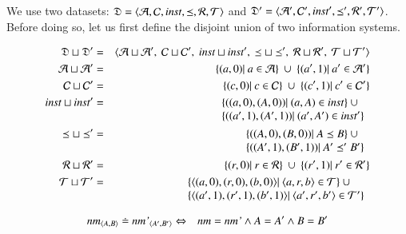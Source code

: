 \documentclass{elsarticle}
\begin{document}
	We use two datasets: $\mathfrak{D}=\langle\mathcal{A},\mathcal{C},\text{\it inst\/},\preceq,\mathcal{R},\mathcal{T}\rangle$ and $\mathfrak{D}'=\langle\mathcal{A}',\mathcal{C}',\text{\it inst\/}',\preceq',\mathcal{R}',\mathcal{T}'\rangle$.
	Before doing so, let us first define the disjoint union of two information systems.
\begin{definition}
	\begin{eqnarray}
		\dataset\sqcup\dataset'&=&\la\atoms\sqcup\atoms',\ \concepts\sqcup\concepts',\ \inst\sqcup\inst',\ \isa\sqcup\isa',\ \rels\sqcup\rels',\ \triples\sqcup\triples'\ra\\
		\atoms\sqcup\atoms'&=&\{(a,0)|\ a\in\atoms\}\ \cup\ \{(a',1)|\ a'\in\atoms'\}\\
		\concepts\sqcup\concepts'&=&\{(c,0)|\ c\in\concepts\}\ \cup\ \{(c',1)|\ c'\in\concepts'\}\\
		\inst\sqcup\inst'&=&\begin{array}[t]{@{}l}
							  \{((a,0),(A,0))|\ (a,A)\in\inst\}\ \cup\\
			                  \{((a',1),(A',1))|\ (a',A')\in\inst'\}
							\end{array}\\
		\isa\sqcup\isa'&=&\begin{array}[t]{@{}l}
							  \{((A,0),(B,0))|\ A\isa B\}\ \cup\\
			                  \{((A',1),(B',1))|\ A'\isa' B'\}
							\end{array}\\
		\rels\sqcup\rels'&=&\{(r,0)|\ r\in\rels\}\ \cup\ \{(r',1)|\ r'\in\rels'\}\\
		\triples\sqcup\triples'&=&\begin{array}[t]{@{}l}
			                        \{\triple{(a,0)}{(r,0)}{(b,0)}|\ \triple{a}{r}{b}\in\triples\}\ \cup\\
			                        \{\triple{(a',1)}{(r',1)}{(b',1)}|\ \triple{a'}{r'}{b'}\in\triples'\}
								   \end{array}
	\end{eqnarray}
\end{definition}
\begin{definition}[$\doteq$]
	\begin{eqnarray}
		\text{\it nm\/}_{\langle{A},{B}\rangle}\doteq\text{\it nm'\/}_{\langle{A'},{B'}\rangle}&\Leftrightarrow&\text{\it nm\/}=\text{\it nm'\/}\wedge A=A'\wedge B=B'
	\end{eqnarray}
\end{definition}
\end{document}
